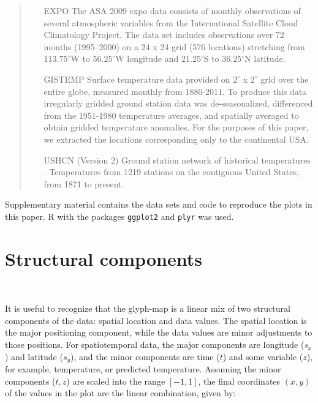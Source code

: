 \documentclass[oneside]{article}
\begin{document}
\begin{quote}
\begin{itemize} \itemsep 0in

\item[EXPO] The ASA 2009 expo data \citep{murrell:2010} consists
  of monthly observations of several atmospheric variables from the
  International Satellite Cloud Climatology Project. The data set
  includes observations over 72 months (1995--2000) on a 24 x 24 grid
  (576 locations) stretching from $113.75^{\circ}$W to
  $56.25^{\circ}$W longitude and $21.25^{\circ}$S to $36.25{^\circ}$N
  latitude.

\item[GISTEMP] Surface temperature data provided on $2^{\circ}$ x
  $2^{\circ}$ grid over the entire globe, measured monthly
  \citep{GISTEMP} from 1880-2011. To produce this data irregularly
  gridded ground station data was de-seasonalized, differenced from
  the 1951-1980 temperature averages, and spatially averaged to obtain
  gridded temperature anomalies. For the purposes of this paper, we
  extracted the locations corresponding only to the continental USA.

\item[USHCN] (Version 2) Ground station network of historical
  temperatures \citep{USHCN}. Temperatures from 1219 stations on the
  contiguous United States, from 1871 to present.
  
\end{itemize}
\end{quote}
Supplementary material contains the data sets and code to reproduce the plots in this paper.  R \citep{R} with the packages {\tt ggplot2} \citep{me:ggplot2} and {\tt plyr} \citep{me:plyr} was used. 

\section{Structural components}~\label{sec:construction}

It is useful to recognize that the glyph-map is a linear mix of two structural components of the data: spatial location and data values. The spatial location is the major positioning component, while the data values are minor adjustments to those positions. For spatiotemporal data, the major components are longitude ($s_x$) and latitude ($s_y$), and the minor components are time ($t$) and some variable ($z$), for example, temperature, or predicted temperature. Assuming the minor components ($t, z$) are scaled into the range $[-1, 1]$, the final coordinates $(x,y)$ of the values in the plot are the linear combination, given by:
\end{document}
